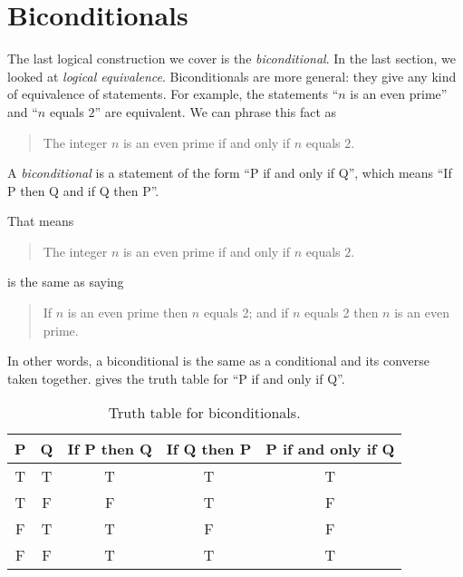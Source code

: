 \documentclass{tufte-book}
\begin{document}




\section{Biconditionals}
\label{sec:biconditionals}

The last logical construction we cover is the \emph{biconditional}. In the last section, we looked at \emph{logical equivalence}. Biconditionals are more general: they give any kind of equivalence of statements. For example, the statements ``$n$ is an even prime'' and ``$n$ equals $2$'' are equivalent. We can phrase this fact as
\begin{quote}
  The integer $n$ is an even prime if and only if $n$ equals $2$.
\end{quote}

\begin{definition}
  A \emph{biconditional} is a statement of the form ``P if and only if Q'', which means ``If P then Q and if Q then P''.
\end{definition}

That means
\begin{quote}
  The integer $n$ is an even prime if and only if $n$ equals $2$.
\end{quote}
is the same as saying
\begin{quote}
  If $n$ is an even prime then $n$ equals 2; and if $n$ equals 2 then $n$ is an even prime.
\end{quote}
In other words, a biconditional is the same as a conditional and its converse taken together.  gives the truth table for ``P if and only if Q''.

\begin{table}
  \begin{center}
    \begin{tabular}{ccccc}
      \toprule
      P & Q & If P then Q & If Q then P & P if and only if Q \\ \midrule
      T & T & T & T & T\\
      T & F & F & T & F\\
      F & T & T & F & F\\
      F & F & T & T & T\\ \bottomrule
    \end{tabular}
  \end{center}
  \caption{Truth table for biconditionals.}
  \label{tab:truth-table-iff}
\end{table}
\end{document}
